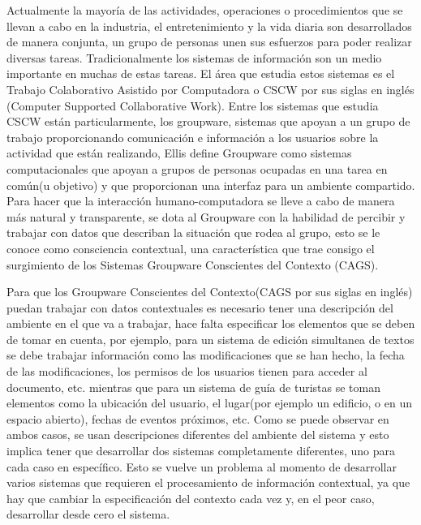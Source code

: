 \label{sec:intro}
Actualmente la mayor\'ia de las actividades, operaciones o procedimientos que se llevan a cabo en la industria, el entretenimiento y la vida diaria son desarrollados de manera conjunta, un grupo de personas unen sus esfuerzos para poder realizar diversas tareas. Tradicionalmente los sistemas de informaci\'on son un medio importante en muchas de estas tareas. El \'area que estudia estos sistemas es el Trabajo Colaborativo Asistido por Computadora o CSCW por sus siglas en ingl\'es (Computer Supported Collaborative Work). Entre los sistemas que estudia CSCW est\'an particularmente, los groupware, sistemas que apoyan a un grupo de trabajo proporcionando comunicaci\'on e informaci\'on a los usuarios sobre la actividad que est\'an realizando, Ellis \cite{ellis1991groupware} define Groupware como sistemas computacionales que apoyan a grupos de personas ocupadas en una tarea en com\'un(u objetivo) y que proporcionan una interfaz para un ambiente compartido. Para hacer que la interacci\'on humano-computadora se lleve a cabo de manera m\'as natural y transparente, se dota al Groupware con la habilidad de percibir y trabajar con datos que describan la situaci\'on que rodea al grupo, esto se le conoce como consciencia contextual, una caracter\'istica que trae consigo el surgimiento de los Sistemas Groupware Conscientes del Contexto (CAGS).


Para que los Groupware Conscientes del Contexto(CAGS por sus siglas en ingl\'es) puedan trabajar con datos contextuales es necesario tener una descripci\'on del ambiente en el que va a trabajar, hace falta especificar los elementos que se deben de tomar en cuenta, por ejemplo, para un sistema de edici\'on simultanea de textos se debe trabajar informaci\'on como las modificaciones que se han hecho, la fecha de las modificaciones, los permisos de los usuarios tienen para acceder al documento, etc. mientras que para un sistema de gu\'ia de turistas se toman elementos como la ubicaci\'on del usuario, el lugar(por ejemplo un edificio, o en un espacio abierto), fechas de eventos pr\'oximos, etc. Como se puede observar en ambos casos, se usan descripciones diferentes del ambiente del sistema y esto implica tener que desarrollar dos sistemas completamente diferentes, uno para cada caso en espec\'ifico. Esto se vuelve un problema al momento de desarrollar varios sistemas que requieren el procesamiento de informaci\'on contextual, ya que hay que cambiar la especificaci\'on del contexto cada vez y, en el peor caso, desarrollar desde cero el sistema.


